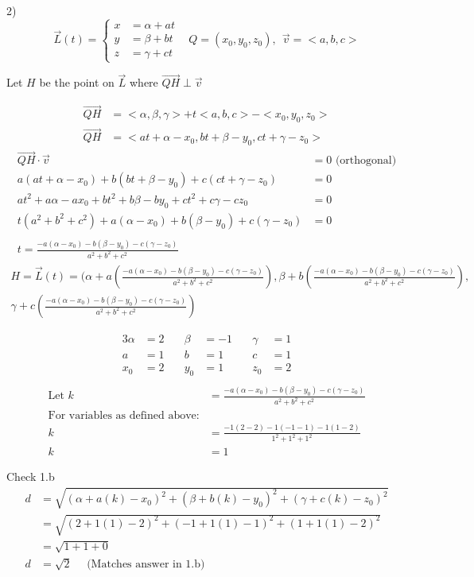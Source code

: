 \documentclass{article}
\begin{document}
2)
\[\vec{L}(t) = \left\{
  \begin{array}{lr}
    x &= \alpha + at \\
    y &= \beta + bt \\
    z &= \gamma + ct
  \end{array}
\right.
\;\;\;
Q = (x_0, y_0, z_0) , \:\: \vec{v} = <a, b, c>
\]
\begin{center}
Let $H$ be the point on $\vec{L}$ where $\vec{QH} \perp \vec{v}$
\end{center}

\begin{align*}
\vec{QH} &= <\alpha, \beta, \gamma> + t<a, b, c> - <x_0, y_0, z_0> \\
\vec{QH} &= <at + \alpha - x_0, bt + \beta - y_0, ct + \gamma - z_0>
\end{align*}
\begin{align*}
\vec{QH} \cdot \vec{v} &= 0  \text{ (orthogonal)} \\
a(at + \alpha - x_0) + b(bt + \beta - y_0) + c(ct + \gamma - z_0) &= 0 \\
at^2 + a\alpha - ax_0 + bt^2 + b\beta - by_0 + ct^2 + c\gamma - cz_0 &= 0 \\
t(a^2 + b^2 + c^2) + a(\alpha - x_0) + b(\beta - y_0) + c(\gamma - z_0) &= 0 \\
\\
t = \frac{-a(\alpha - x_0) - b(\beta - y_0) - c(\gamma - z_0)}{a^2+b^2+c^2}
\end{align*}
\begin{equation*}
\begin{multlined}
H = \vec{L}(t) = (\alpha + a(\frac{-a(\alpha - x_0) - b(\beta - y_0) - c(\gamma - z_0)}{a^2+b^2+c^2}), \beta + b(\frac{-a(\alpha - x_0) - b(\beta - y_0) - c(\gamma - z_0)}{a^2+b^2+c^2}), \\\gamma + c(\frac{-a(\alpha - x_0) - b(\beta - y_0) - c(\gamma - z_0)}{a^2+b^2+c^2})
\end{multlined}
\end{equation*}

\begin{alignat*}{3}
\alpha &= 2 \quad & \beta &= -1 \quad & \gamma &= 1 \\
a &= 1    \quad & b &= 1    \quad & c &= 1\\
x_0 &= 2    \quad & y_0 &= 1  \quad & z_0 &= 2\\
\end{alignat*}
\begin{align*}
\text{Let } k &= \frac{-a(\alpha - x_0) - b(\beta - y_0) - c(\gamma - z_0)}{a^2+b^2+c^2} \\
\text{For variables as defined above:} \\
k &= \frac{-1(2-2) - 1(-1-1) - 1(1-2)}{1^2 + 1^2 + 1^2} \\
k &= 1
\end{align*}

Check 1.b
\begin{align*}
d &= \sqrt{(\alpha + a(k) - x_0)^2 + (\beta + b(k) - y_0)^2 + (\gamma + c(k) - z_0)^2} \\
&= \sqrt{(2 + 1(1) - 2)^2 + (-1 + 1(1) - 1)^2 + (1 + 1(1) - 2)^2} \\
&= \sqrt{1 + 1 + 0} \\
d &= \sqrt{2} \quad \text{ (Matches answer in 1.b)}
\end{align*}
\end{document}
